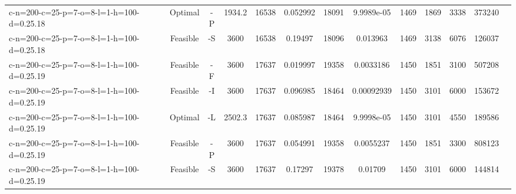 \documentclass[landscape, a4paper]{article}
\begin{document}
\begin{center}
\begin{tabular}{lcccccccccccc}
c-n=200-c=25-p=7-o=8-l=1-h=100-d=0.25.18 & Optimal & -P & 1934.2 & 16538 & 0.052992 & 18091 & 9.9989e-05 & 1469 & 1869 & 3338 & 373240 & \\
c-n=200-c=25-p=7-o=8-l=1-h=100-d=0.25.18 & Feasible & -S & 3600 & 16538 & 0.19497 & 18096 & 0.013963 & 1469 & 3138 & 6076 & 126037 & \\
c-n=200-c=25-p=7-o=8-l=1-h=100-d=0.25.19 & Feasible & -F & 3600 & 17637 & 0.019997 & 19358 & 0.0033186 & 1450 & 1851 & 3100 & 507208 & \\
c-n=200-c=25-p=7-o=8-l=1-h=100-d=0.25.19 & Feasible & -I & 3600 & 17637 & 0.096985 & 18464 & 0.00092939 & 1450 & 3101 & 6000 & 153672 & \\
c-n=200-c=25-p=7-o=8-l=1-h=100-d=0.25.19 & Optimal & -L & 2502.3 & 17637 & 0.085987 & 18464 & 9.9998e-05 & 1450 & 3101 & 4550 & 189586 & \\
c-n=200-c=25-p=7-o=8-l=1-h=100-d=0.25.19 & Feasible & -P & 3600 & 17637 & 0.054991 & 19358 & 0.0055237 & 1450 & 1851 & 3300 & 808123 & \\
c-n=200-c=25-p=7-o=8-l=1-h=100-d=0.25.19 & Feasible & -S & 3600 & 17637 & 0.17297 & 19378 & 0.01709 & 1450 & 3101 & 6000 & 144814 & \\
\end{tabular}
\end{center}
\end{document}
